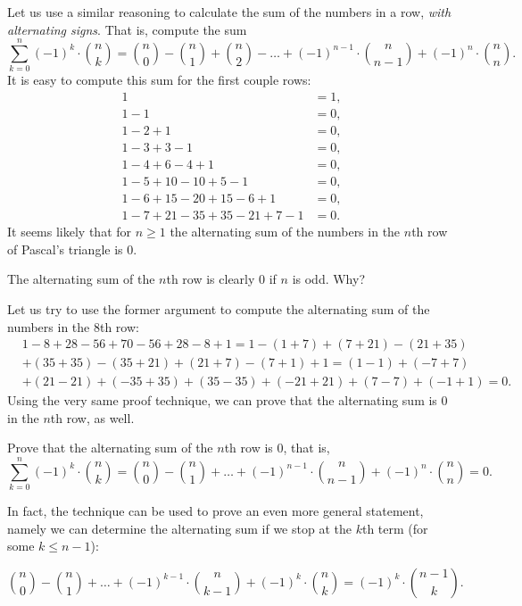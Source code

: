 Let us use a similar reasoning to calculate the sum of the numbers in a row, \emph{with alternating signs}. 
That is, compute the sum
\[
\sum_{k=0}^n \left( -1 \right)^k \cdot \binom{n}{k} = \binom{n}{0} - \binom{n}{1} + \binom{n}{2} - \dots + \left( -1 \right)^{n-1} \cdot \binom{n}{n-1} + \left( -1 \right)^{n} \cdot \binom{n}{n}. 
\]
It is easy to compute this sum for the first couple rows: 
\begin{align*}
1 & = 1, \\
1 - 1 &= 0, \\
1 - 2 + 1 &= 0, \\
1 - 3 + 3 - 1 &= 0, \\
1 - 4 + 6 - 4 + 1 &= 0, \\
1 - 5 + 10 - 10 + 5 - 1 &= 0, \\
1 - 6 + 15 - 20 + 15 - 6 + 1 &= 0, \\
1 - 7 + 21 - 35 + 35 - 21 + 7 - 1 &= 0.
\end{align*}
It seems likely that for $n\geq 1$ the alternating sum of the numbers in the $n$th row of Pascal's triangle is 0. 
\begin{exercise}\label{ex:alternatingsum}
The alternating sum of the $n$th row is clearly 0 if $n$ is odd. 
Why? 
\end{exercise}
Let us try to use the former argument to compute the alternating sum of the numbers in the 8th row: 
\begin{align*}
& 1 - 8 + 28 - 56 + 70 - 56 + 28 - 8 + 1 = 1 - (1 + 7) + (7 + 21) - (21 + 35) \\
&+ (35 + 35) - (35 + 21) + (21+7) - (7 + 1) + 1 = (1-1) + (-7+7) \\
&+ (21-21) + (-35 + 35) + (35-35) + (-21 + 21) + (7-7) + (-1+1) = 0. 
\end{align*}
Using the very same proof technique, we can prove that the alternating sum is 0 in the $n$th row, as well. 
\begin{exercise}\label{ex:alternatingsum2}
Prove that the alternating sum of the $n$th row is 0, 
that is,  
\[
\sum_{k=0}^n \left( -1 \right)^k \cdot \binom{n}{k} = \binom{n}{0} - \binom{n}{1} + \dots + \left( -1 \right)^{n-1} \cdot \binom{n}{n-1} + \left( -1 \right)^{n} \cdot \binom{n}{n} = 0. 
\]
\end{exercise}
In fact, the technique can be used to prove an even more general statement, 
namely we can determine the alternating sum if we stop at the $k$th term (for some $k\leq n-1$): 

\begin{proposition}\label{prop:alternatingsum}
\[
\binom{n}{0} - \binom{n}{1} + \dots + \left( -1 \right)^{k-1} \cdot \binom{n}{k-1} + \left( -1 \right)^{k} \cdot \binom{n}{k} = \left( - 1 \right)^k \cdot \binom{n-1}{k}. 
\]
\end{proposition}

